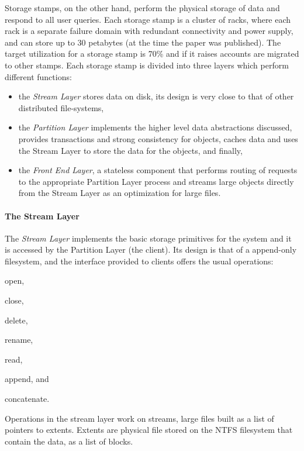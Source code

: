 Storage stamps, on the other hand, perform the physical storage of data and respond to all user queries.
Each storage stamp is a cluster of racks, where each rack is a separate failure domain with redundant connectivity and power supply, and can store up to 30 petabytes (at the time the paper was published).
The target utilization for a storage stamp is 70\% and if it raises accounts are migrated to other stamps.
Each storage stamp is divided into three layers which perform different functions:
\begin{itemize}
    \item the \emph{Stream Layer} stores data on disk, its design is very close to that of other distributed file-systems,
    \item the \emph{Partition Layer} implements the higher level data abstractions discussed, provides transactions and strong consistency for objects, caches data and uses the Stream Layer to store the data for the objects, and finally,
    \item the \emph{Front End Layer}, a stateless component that performs routing of requests to the appropriate Partition Layer process and streams large objects directly from the Stream Layer as an optimization for large files.
\end{itemize}

\paragraph{The Stream Layer}

The \emph{Stream Layer} implements the basic storage primitives for the system and it is accessed by the Partition Layer (the client).
Its design is that of a append-only filesystem, and the interface provided to clients offers the usual operations:
\begin{inparaenum}[i)]
    \item open,
    \item close,
    \item delete,
    \item rename,
    \item read,
    \item append, and
    \item concatenate.
\end{inparaenum}
Operations in the stream layer work on streams, large files built as a list of pointers to extents.
Extents are physical file stored on the NTFS filesystem that contain the data, as a list of blocks.

